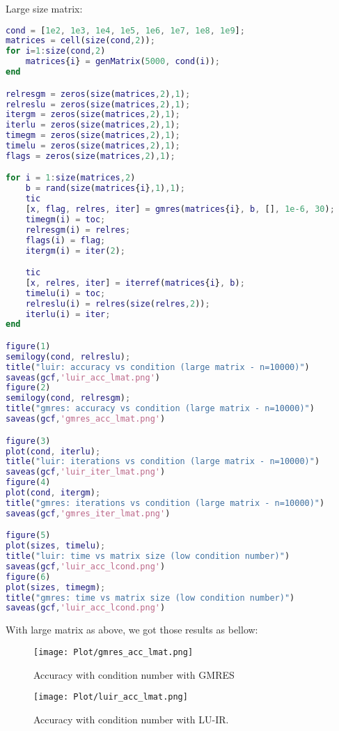 \clearpage
\newpage
Large size matrix:
\begin{lstlisting}[language=Matlab, caption=Large size matrix]
    cond = [1e2, 1e3, 1e4, 1e5, 1e6, 1e7, 1e8, 1e9];
matrices = cell(size(cond,2));
for i=1:size(cond,2)
    matrices{i} = genMatrix(5000, cond(i));
end

relresgm = zeros(size(matrices,2),1);
relreslu = zeros(size(matrices,2),1);
itergm = zeros(size(matrices,2),1);
iterlu = zeros(size(matrices,2),1);
timegm = zeros(size(matrices,2),1);
timelu = zeros(size(matrices,2),1);
flags = zeros(size(matrices,2),1);

for i = 1:size(matrices,2)
    b = rand(size(matrices{i},1),1);
    tic
    [x, flag, relres, iter] = gmres(matrices{i}, b, [], 1e-6, 30);
    timegm(i) = toc;
    relresgm(i) = relres;
    flags(i) = flag;
    itergm(i) = iter(2);

    tic
    [x, relres, iter] = iterref(matrices{i}, b);
    timelu(i) = toc;
    relreslu(i) = relres(size(relres,2));
    iterlu(i) = iter;
end

figure(1)
semilogy(cond, relreslu);
title("luir: accuracy vs condition (large matrix - n=10000)")
saveas(gcf,'luir_acc_lmat.png')
figure(2)
semilogy(cond, relresgm);
title("gmres: accuracy vs condition (large matrix - n=10000)")
saveas(gcf,'gmres_acc_lmat.png')

figure(3)
plot(cond, iterlu);
title("luir: iterations vs condition (large matrix - n=10000)")
saveas(gcf,'luir_iter_lmat.png')
figure(4)
plot(cond, itergm);
title("gmres: iterations vs condition (large matrix - n=10000)")
saveas(gcf,'gmres_iter_lmat.png')

figure(5)
plot(sizes, timelu);
title("luir: time vs matrix size (low condition number)")
saveas(gcf,'luir_acc_lcond.png')
figure(6)
plot(sizes, timegm);
title("gmres: time vs matrix size (low condition number)")
saveas(gcf,'luir_acc_lcond.png')

\end{lstlisting}
With large matrix as above, we got those results as bellow:
\begin{figure}[ht]
     \begin{minipage}[b]{0.5\linewidth}
        \centering
   \texttt{[image: Plot/gmres\_acc\_lmat.png]}
        \caption{Accuracy with condition number with GMRES}
        \label{fig:image7}
    \end{minipage}
    \hspace{0.5cm} 
    \begin{minipage}[b]{0.5\linewidth}
        \centering
        \texttt{[image: Plot/luir\_acc\_lmat.png]}
        \caption{Accuracy with condition number with LU-IR.}
        \label{fig:image8}
    \end{minipage}
\end{figure}

